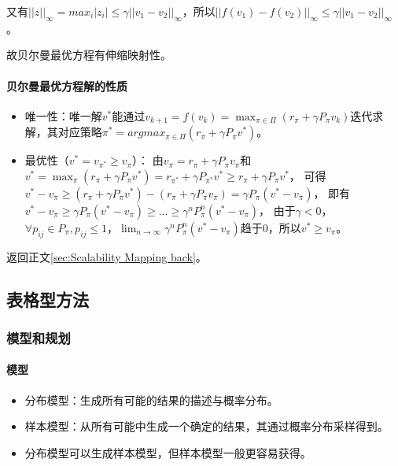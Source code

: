 \documentclass[
12pt, %
a4paper, 
oneside, %
headinclude,footinclude, %
]{scrartcl}
\begin{document}
又有$ ||z||_\infty = max_i |z_i| \leq \gamma ||v_1 - v_2||_\infty $，所以$ ||f(v_1) - f(v_2)||_\infty \leq \gamma ||v_1 - v_2||_\infty $。

故贝尔曼最优方程有伸缩映射性。
\paragraph{贝尔曼最优方程解的性质}
\begin{itemize}
\item 唯一性：唯一解$ v^* $能通过$ v_{k + 1} = f(v_k) = \max_{\pi \in \Pi} (r_\pi + \gamma P_\pi v_k) $迭代求解，其对应策略$ \pi^* = argmax_{\pi \in \Pi} (r_\pi + \gamma P_\pi v^*) $。
\item 最优性（$ v^* = v_{\pi^*} \geq v_{\pi} $）：
由$ v_{\pi} = r_{\pi} + \gamma P_{\pi} v_{\pi} $和$ v^* = \max_{\pi} (r_{\pi} + \gamma P_{\pi} v^*) = r_{\pi^*} + \gamma P_{\pi^*} v^* \geq r_{\pi} + \gamma P_{\pi} v^* $，
可得$ v^* - v_{\pi} \geq (r_{\pi} + \gamma P_{\pi} v^*) - (r_{\pi} + \gamma P_{\pi} v_{\pi}) = \gamma P_{\pi} (v^* - v_{\pi}) $，
即有$ v^* - v_{\pi} \geq \gamma P_{\pi} (v^* - v_{\pi}) \geq \dots \geq \gamma^n P_{\pi}^n (v^* - v_{\pi}) $，
由于$ \gamma < 0 $，$ \forall p_{ij} \in P_{\pi}, p_{ij} \leq 1 $，$ \lim_{n \to \infty} \gamma^n P_{\pi}^n (v^* - v_{\pi}) $趋于0，所以$ v^* \geq v_{\pi} $。
\end{itemize}

返回正文\ref{sec:Scalability Mapping back}。
\subsection[表格型方法]{表格型方法}\label{sec:table}
\subsubsection[模型和规划]{模型和规划}
\paragraph{模型}
\begin{itemize}
\item 分布模型：生成所有可能的结果的描述与概率分布。
\item 样本模型：从所有可能中生成一个确定的结果，其通过概率分布采样得到。
\item 分布模型可以生成样本模型，但样本模型一般更容易获得。
\end{itemize}
\end{document}
